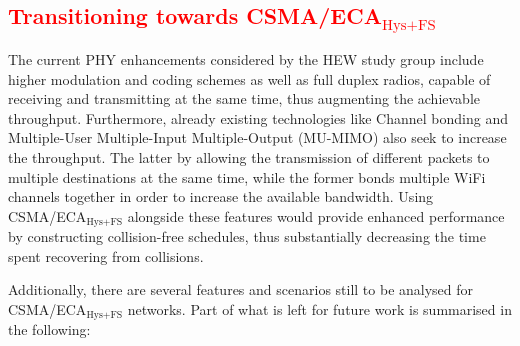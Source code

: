 \textcolor{red}{\section{Transitioning towards CSMA/ECA$_{\text{Hys+FS}}$}\label{ECAtoCA}}

The current PHY enhancements considered by the HEW study group include higher modulation and coding schemes as well as full duplex radios, capable of receiving and transmitting at the same time, thus augmenting the achievable throughput. Furthermore, already existing technologies like Channel bonding and Multiple-User Multiple-Input Multiple-Output (MU-MIMO) also seek to increase the throughput. The latter by allowing the transmission of different packets to multiple destinations at the same time, while the former bonds multiple WiFi channels together in order to increase the available bandwidth. Using CSMA/ECA$_{\text{Hys+FS}}$ alongside these features would provide enhanced performance by constructing collision-free schedules, thus substantially decreasing the time spent recovering from collisions.

Additionally, there are several features and scenarios still to be analysed for CSMA/ECA$_{\text{Hys+FS}}$ networks. Part of what is left for future work is summarised in the following:

